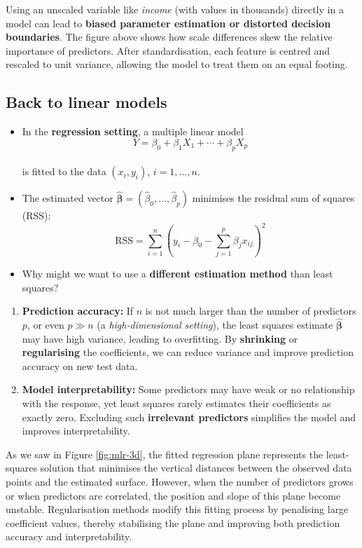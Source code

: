 \documentclass[
  letterpaper,
  DIV=11,
  numbers=noendperiod]{scrartcl}
\begin{document}
Using an unscaled variable like \emph{income} (with values in thousands)
directly in a model can lead to \textbf{biased parameter estimation or
distorted decision boundaries}. The figure above shows how scale
differences skew the relative importance of predictors. After
standardisation, each feature is centred and rescaled to unit variance,
allowing the model to treat them on an equal footing.

\subsection{Back to linear models}\label{back-to-linear-models}

\begin{itemize}
\item
  In the \textbf{regression setting}, a multiple linear model\\
  \[ Y = \beta_0 + \beta_1 X_1 + \cdots + \beta_p X_p \]\\
  is fitted to the data \((x_i, y_i)\), \(i = 1, \dots, n\).
\item
  The estimated vector
  \(\hat{\boldsymbol{\beta}} = (\hat{\beta}_0, \dots, \hat{\beta}_p)\)
  minimises the residual sum of squares (RSS):\\
  \[ \text{RSS} = \sum_{i=1}^{n} \left( y_i - \beta_0 - \sum_{j=1}^{p} \beta_j x_{ij} \right)^2 \]
\item
  Why might we want to use a \textbf{different estimation method} than
  least squares?
\end{itemize}

\begin{enumerate}
\def\labelenumi{(\arabic{enumi})}
\item
  \textbf{Prediction accuracy:} If \(n\) is not much larger than the
  number of predictors \(p\), or even \(p \gg n\) (a
  \emph{high-dimensional setting}), the least squares estimate
  \(\hat{\boldsymbol{\beta}}\) may have high variance, leading to
  overfitting. By \textbf{shrinking} or \textbf{regularising} the
  coefficients, we can reduce variance and improve prediction accuracy
  on new test data.
\item
  \textbf{Model interpretability:} Some predictors may have weak or no
  relationship with the response, yet least squares rarely estimates
  their coefficients as exactly zero. Excluding such \textbf{irrelevant
  predictors} simplifies the model and improves interpretability.
\end{enumerate}

As we saw in Figure \ref{fig:mlr-3d}, the fitted regression plane
represents the least-squares solution that minimises the vertical
distances between the observed data points and the estimated surface.
However, when the number of predictors grows or when predictors are
correlated, the position and slope of this plane become unstable.
Regularisation methods modify this fitting process by penalising large
coefficient values, thereby stabilising the plane and improving both
prediction accuracy and interpretability.
\end{document}
